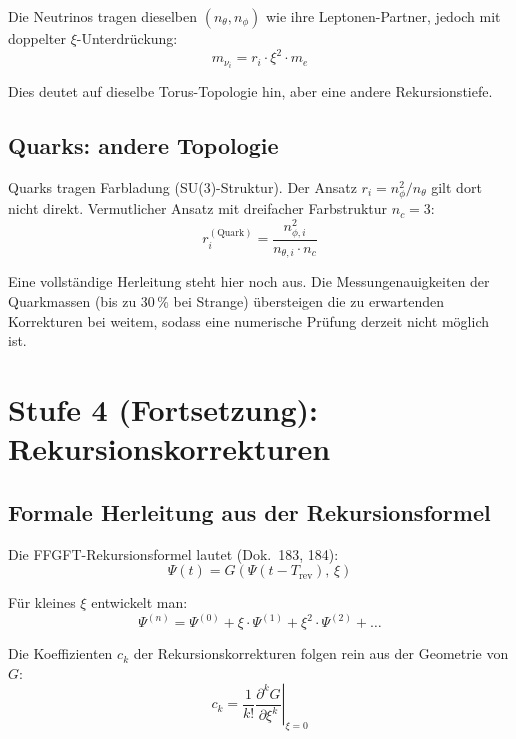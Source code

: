 Die Neutrinos tragen dieselben $(n_\theta, n_\phi)$ wie ihre
Leptonen-Partner, jedoch mit doppelter $\xi$-Unterdrückung:
\begin{equation}
    m_{\nu_i} = r_i \cdot \xi^2 \cdot m_e
\end{equation}

Dies deutet auf dieselbe Torus-Topologie hin, aber eine andere
Rekursionstiefe.

\subsection{Quarks: andere Topologie}

Quarks tragen Farbladung (SU(3)-Struktur). Der Ansatz
$r_i = n_\phi^2 / n_\theta$ gilt dort nicht direkt. Vermutlicher
Ansatz mit dreifacher Farbstruktur $n_c = 3$:
\begin{equation}
    r_i^{(\mathrm{Quark})} = \frac{n_{\phi,i}^2}{n_{\theta,i} \cdot n_c}
\end{equation}

Eine vollständige Herleitung steht hier noch aus. Die Messungenauigkeiten
der Quarkmassen (bis zu 30\,\% bei Strange) übersteigen die zu
erwartenden Korrekturen bei weitem, sodass eine numerische Prüfung
derzeit nicht möglich ist.

\section{Stufe 4 (Fortsetzung): Rekursionskorrekturen}

\subsection{Formale Herleitung aus der Rekursionsformel}

Die FFGFT-Rekursionsformel lautet (Dok.~183, 184):
\begin{equation}
    \Psi(t) = G\!\left(\Psi(t - T_{\mathrm{rev}}),\, \xi\right)
    \label{eq:recursion}
\end{equation}

Für kleines $\xi$ entwickelt man:
\begin{equation}
    \Psi^{(n)} = \Psi^{(0)}
    + \xi \cdot \Psi^{(1)}
    + \xi^2 \cdot \Psi^{(2)}
    + \ldots
\end{equation}

Die Koeffizienten $c_k$ der Rekursionskorrekturen folgen rein
aus der Geometrie von $G$:
\begin{equation}
    c_k = \frac{1}{k!}
    \left.\frac{\partial^k G}{\partial \xi^k}\right|_{\xi=0}
    \label{eq:ck}
\end{equation}

